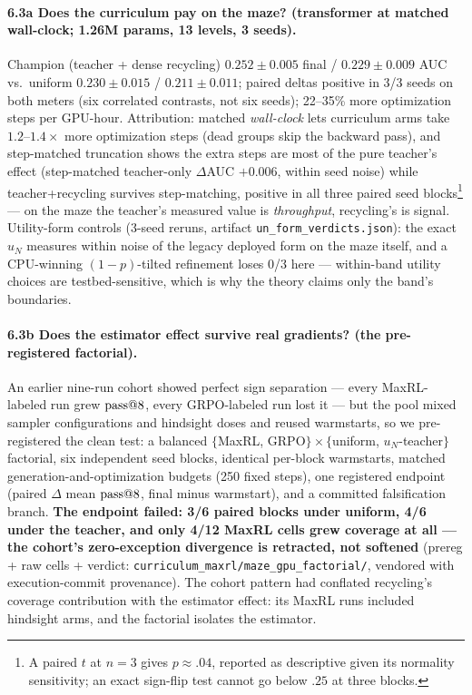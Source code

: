 \paragraph{6.3a Does the curriculum pay on the maze? (transformer at
matched wall-clock; 1.26M params, 13 levels, 3 seeds).} Champion
(teacher + dense recycling) $0.252{\pm}0.005$ final /
$0.229{\pm}0.009$ AUC vs.\ uniform $0.230{\pm}0.015$ /
$0.211{\pm}0.011$; paired deltas positive in 3/3 seeds on both meters
(six correlated contrasts, not six seeds); 22--35\% more optimization
steps per GPU-hour. Attribution: matched \emph{wall-clock} lets
curriculum arms take $1.2$--$1.4\times$ more optimization steps (dead
groups skip the backward pass), and step-matched truncation shows the
extra steps are most of the pure teacher's effect (step-matched
teacher-only $\Delta$AUC $+0.006$, within seed noise) while
teacher+recycling survives step-matching, positive in all three paired
seed blocks\footnote{A paired $t$ at $n{=}3$ gives $p{\approx}.04$,
reported as descriptive given its normality sensitivity; an exact
sign-flip test cannot go below $.25$ at three blocks.} --- on the maze
the teacher's measured value is \emph{throughput}, recycling's is
signal. Utility-form controls (3-seed reruns, artifact
\texttt{un\_form\_verdicts.json}): the exact $u_N$ measures within
noise of the legacy deployed form on the maze itself, and a
CPU-winning $(1{-}p)$-tilted refinement loses 0/3 here --- within-band
utility choices are testbed-sensitive, which is why the theory claims
only the band's boundaries.

\paragraph{6.3b Does the estimator effect survive real gradients?
(the pre-registered factorial).} An earlier
nine-run cohort showed perfect sign separation --- every MaxRL-labeled
run grew $\text{pass@}8$, every GRPO-labeled run lost it --- but the pool
mixed sampler configurations and hindsight doses and reused
warmstarts, so we pre-registered the clean test: a balanced
$\{$MaxRL, GRPO$\}\times\{$uniform, $u_N$-teacher$\}$ factorial, six
independent seed blocks, identical per-block warmstarts, matched
generation-and-optimization budgets (250 fixed steps), one registered
endpoint (paired $\Delta$ mean $\text{pass@}8$, final minus warmstart),
and a committed falsification branch. \textbf{The endpoint failed:
3/6 paired blocks under uniform, 4/6 under the teacher, and only 4/12
MaxRL cells grew coverage at all --- the cohort's zero-exception
divergence is retracted, not softened} (prereg + raw cells + verdict:
\texttt{curriculum\_maxrl/maze\_gpu\_factorial/}, vendored with
execution-commit provenance). The cohort pattern had conflated
recycling's coverage contribution with the estimator effect: its MaxRL
runs included hindsight arms, and the factorial isolates the
estimator.

